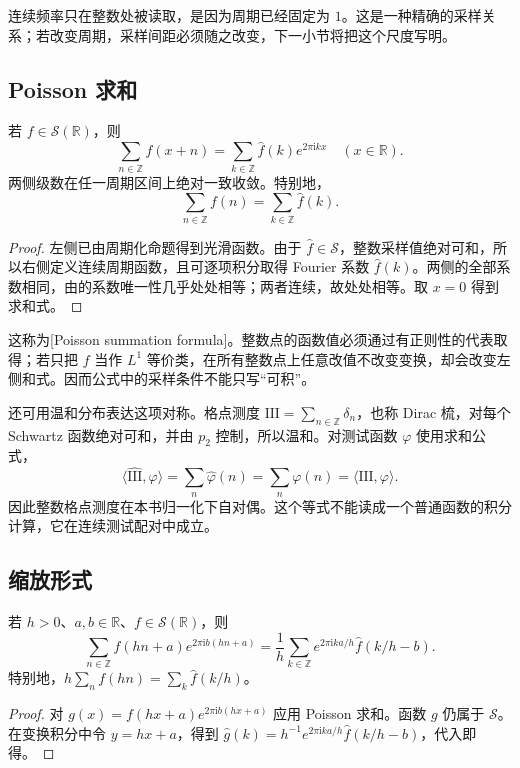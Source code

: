 连续频率只在整数处被读取，是因为周期已经固定为 \(1\)。这是一种精确的采样关系；若改变周期，采样间距必须随之改变，下一小节将把这个尺度写明。

\subsection{Poisson 求和}
\label{b2:subsec:060103}

\begin{theorem}[Poisson 求和]\label{b2:thm:06-poisson}
若 \(f\in\mathcal S(\mathbb R)\)，则
\begin{equation}\label{b2:eq:06-poisson-periodic}
 \sum_{n\in\mathbb Z}f(x+n)
 =\sum_{k\in\mathbb Z}\widehat f(k)e^{2\pi\mathrm{i}kx}
 \quad(x\in\mathbb R).
\end{equation}
两侧级数在任一周期区间上绝对一致收敛。特别地，
\[
 \sum_{n\in\mathbb Z}f(n)=\sum_{k\in\mathbb Z}\widehat f(k).
\]
\end{theorem}
\begin{proof}
左侧已由周期化命题得到光滑函数。由于 \(\widehat f\in\mathcal S\)，整数采样值绝对可和，所以右侧定义连续周期函数，且可逐项积分取得 Fourier 系数 \(\widehat f(k)\)。两侧的全部系数相同，由的系数唯一性几乎处处相等；两者连续，故处处相等。取 \(x=0\) 得到求和式。
\end{proof}

这称为[Poisson summation formula]。整数点的函数值必须通过有正则性的代表取得；若只把 \(f\) 当作 \(L^1\) 等价类，在所有整数点上任意改值不改变变换，却会改变左侧和式。因而公式中的采样条件不能只写“可积”。

\ProseParagraphBreak

还可用温和分布表达这项对称。格点测度 \(\mathrm{III}=\sum_{n\in\mathbb Z}\delta_n\)，也称 Dirac 梳，对每个 Schwartz 函数绝对可和，并由 \(p_2\) 控制，所以温和。对测试函数 \(\varphi\) 使用求和公式，
\[
 \langle\widehat{\mathrm{III}},\varphi\rangle
 =\sum_n\widehat\varphi(n)=\sum_n\varphi(n)
 =\langle\mathrm{III},\varphi\rangle.
\]
因此整数格点测度在本书归一化下自对偶。这个等式不能读成一个普通函数的积分计算，它在连续测试配对中成立。

\subsection{缩放形式}
\label{b2:subsec:060104}

\begin{corollary}\label{b2:cor:06-scaled-poisson}
若 \(h>0\)、\(a,b\in\mathbb R\)、\(f\in\mathcal S(\mathbb R)\)，则
\[
 \sum_{n\in\mathbb Z}f(hn+a)e^{2\pi\mathrm{i}b(hn+a)}
 =\dfrac1h\sum_{k\in\mathbb Z}e^{2\pi\mathrm{i}ka/h}\widehat f(k/h-b).
\]
特别地，\(h\sum_nf(hn)=\sum_k\widehat f(k/h)\)。
\end{corollary}
\begin{proof}
对 \(g(x)=f(hx+a)e^{2\pi\mathrm{i}b(hx+a)}\) 应用 Poisson 求和。函数 \(g\) 仍属于 \(\mathcal S\)。在变换积分中令 \(y=hx+a\)，得到 \(\widehat g(k)=h^{-1}e^{2\pi\mathrm{i}ka/h}\widehat f(k/h-b)\)，代入即得。
\end{proof}

